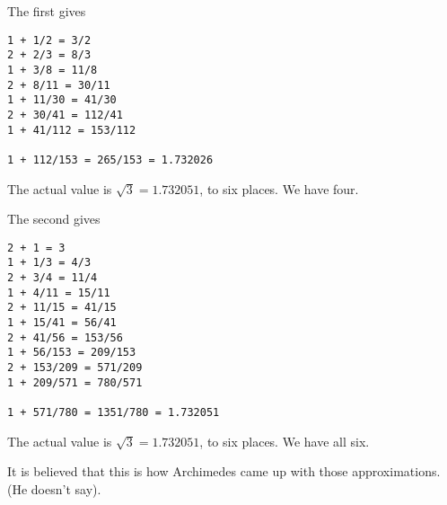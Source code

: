 \documentclass[11pt, oneside]{article}
\begin{document}
The first gives
\begin{verbatim}
1 + 1/2 = 3/2
2 + 2/3 = 8/3
1 + 3/8 = 11/8
2 + 8/11 = 30/11
1 + 11/30 = 41/30
2 + 30/41 = 112/41
1 + 41/112 = 153/112

1 + 112/153 = 265/153 = 1.732026
\end{verbatim}

The actual value is $\sqrt{3} = 1.732051$, to six places.  We have four.

The second gives
\begin{verbatim}
2 + 1 = 3
1 + 1/3 = 4/3
2 + 3/4 = 11/4
1 + 4/11 = 15/11
2 + 11/15 = 41/15
1 + 15/41 = 56/41
2 + 41/56 = 153/56
1 + 56/153 = 209/153
2 + 153/209 = 571/209
1 + 209/571 = 780/571

1 + 571/780 = 1351/780 = 1.732051
\end{verbatim}

The actual value is $\sqrt{3} = 1.732051$, to six places.  We have all six.

It is believed that this is how Archimedes came up with those approximations.  (He doesn't say).
\end{document}
